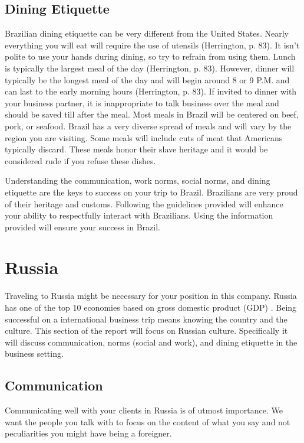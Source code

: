 \documentclass[11pt,a4paper,twoside]{report}
\begin{document}
\section{Dining Etiquette}

Brazilian dining etiquette can be very different from the United States.
Nearly everything you will eat will require the use of utensils
(Herrington, p. 83). It isn’t polite to use your hands during dining, so
try to refrain from using them. Lunch is typically the largest meal of the
day (Herrington, p. 83). However, dinner will typically be the longest meal
of the day and will begin around 8 or 9 P.M. and can last to the early
morning hours (Herrington, p. 83). If invited to dinner with your business
partner, it is inappropriate to talk business over the meal and should be
saved till after the meal. Most meals in Brazil will be centered on beef,
pork, or seafood. Brazil has a very diverse spread of meals and will vary
by the region you are visiting. Some meals will include cuts of meat that
Americans typically discard. These meals honor their slave heritage and it
would be considered rude if you refuse these dishes.

Understanding the communication, work norms, social norms, and dining etiquette
are the keys to success on your trip to Brazil. Brazilians are very proud of
their heritage and customs. Following the guidelines provided will enhance your
ability to respectfully interact with Brazilians. Using the information
provided will ensure your success in Brazil.

\chapter{Russia}

Traveling to Russia might be necessary for your position in this company.
Russia has one of the top 10 economies based on gross domestic product (GDP)
\citep*{russianGDP}. Being successful on a international business trip means knowing the
country and the culture. This section of the report will focus on Russian
culture. Specifically it will discuss communication, norms (social and work),
and dining etiquette in the business setting.

\section{Communication}

Communicating well with your clients in Russia is of utmost importance. We want
the people you talk with to focus on the content of what you say and not
peculiarities you might have being a foreigner.
\end{document}
